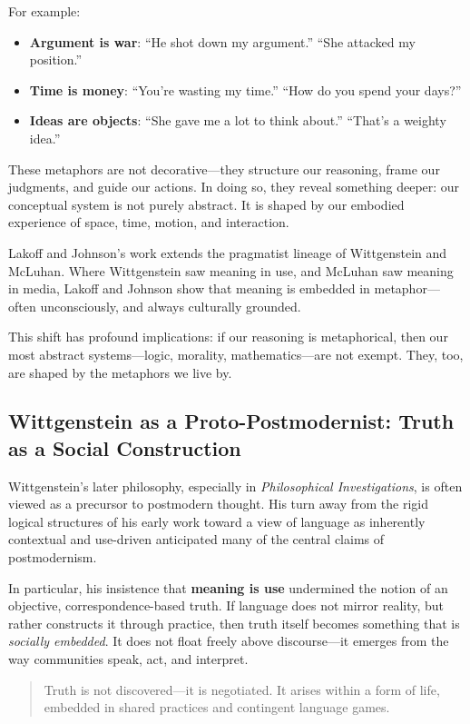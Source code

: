 For example:
\begin{itemize}
    \item \textbf{Argument is war}: ``He shot down my argument.'' ``She attacked my position.''
    \item \textbf{Time is money}: ``You're wasting my time.'' ``How do you spend your days?''
    \item \textbf{Ideas are objects}: ``She gave me a lot to think about.'' ``That's a weighty idea.''
\end{itemize}

These metaphors are not decorative—they structure our reasoning, frame our judgments, and guide our actions. In doing so, they reveal something deeper: our conceptual system is not purely abstract. It is shaped by our embodied experience of space, time, motion, and interaction.

Lakoff and Johnson’s work extends the pragmatist lineage of Wittgenstein and McLuhan. Where Wittgenstein saw meaning in use, and McLuhan saw meaning in media, Lakoff and Johnson show that meaning is embedded in metaphor—often unconsciously, and always culturally grounded.


This shift has profound implications: if our reasoning is metaphorical, then our most abstract systems—logic, morality, mathematics—are not exempt. They, too, are shaped by the metaphors we live by.

\subsection{Wittgenstein as a Proto-Postmodernist: Truth as a Social Construction}

Wittgenstein’s later philosophy, especially in \textit{Philosophical Investigations}, is often viewed as a precursor to postmodern thought. His turn away from the rigid logical structures of his early work toward a view of language as inherently contextual and use-driven anticipated many of the central claims of postmodernism.

In particular, his insistence that \textbf{meaning is use} undermined the notion of an objective, correspondence-based truth. If language does not mirror reality, but rather constructs it through practice, then truth itself becomes something that is \emph{socially embedded}. It does not float freely above discourse—it emerges from the way communities speak, act, and interpret.

\begin{quote}
Truth is not discovered—it is negotiated. It arises within a form of life, embedded in shared practices and contingent language games.
\end{quote}


